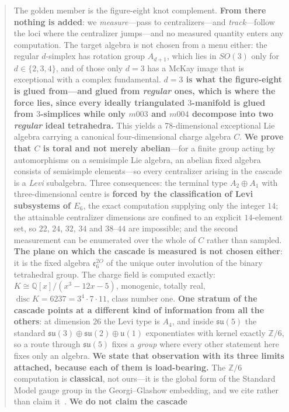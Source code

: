 \documentclass[11pt,reqno]{amsart}
\theoremstyle{plain}
\theoremstyle{definition}
\theoremstyle{remark}
\newcommand{\Q}{\mathbb{Q}}
\newcommand{\Z}{\mathbb{Z}}
\newcommand{\su}{\mathfrak{su}}
\newcommand{\uu}{\mathfrak{u}}
\newcommand{\ee}{\mathfrak{e}}
\newcommand{\disc}{\operatorname{disc}}
\begin{document}
\begin{abstract}
The golden member is the figure-eight knot complement. \textbf{From there nothing is
added}: we \emph{measure}---pass to centralizers---and \emph{track}---follow the loci
where the centralizer jumps---and no measured quantity enters any computation. The
target algebra is not chosen from a menu either: the regular $d$-simplex has rotation
group $A_{d+1}$, which lies in $SO(3)$ only for $d\in\{2,3,4\}$, and of those only
$d=3$ has a McKay image that is exceptional with a complex fundamental. \textbf{$d=3$ is
what the figure-eight is glued from---and glued from \emph{regular} ones, which is where
the force lies, since every ideally triangulated $3$-manifold is glued from $3$-simplices
while only $m003$ and $m004$ decompose into two \emph{regular} ideal tetrahedra.} This yields a $78$-dimensional exceptional Lie
algebra carrying a canonical four-dimensional charge algebra $C$.
\textbf{We prove that $C$ is toral and not merely abelian}---for a finite group acting
by automorphisms on a semisimple Lie algebra, an abelian fixed algebra consists of
semisimple elements---so every centralizer arising in the cascade is a \emph{Levi}
subalgebra. Three consequences: the terminal type $A_2\oplus A_1$ with three-dimensional
centre is \textbf{forced by the classification of Levi subsystems of $E_6$}, the exact
computation supplying only the integer $14$; the attainable centralizer dimensions are
confined to an explicit $14$-element set, so $22$, $24$, $32$, $34$ and $38$--$44$ are
impossible; and the second measurement can be enumerated over the whole of $C$ rather
than sampled. \textbf{The plane on which the cascade is measured is not chosen either}:
it is the fixed algebra $\ee_6^{2O}$ of the unique outer involution of the binary
tetrahedral group. The charge field is computed exactly:
$K\cong\Q[x]/(x^3-12x-5)$, monogenic, totally real, $\disc K=6237=3^4\cdot7\cdot11$,
class number one. \textbf{One stratum of the cascade points at a different kind of
information from all the others}: at dimension $26$ the Levi type is $A_4$, and inside
$\su(5)$ the standard $\su(3)\oplus\su(2)\oplus\uu(1)$ exponentiates with kernel exactly
$\Z/6$, so a route through $\su(5)$ fixes a \emph{group} where every other statement here
fixes only an algebra. \textbf{We state that observation with its three limits attached,
because each of them is load-bearing.} The $\Z/6$ computation is \textbf{classical}, not
ours---it is the global form of the Standard Model gauge group in the
Georgi--Glashow embedding, and we cite rather than claim
it~\cite{GeorgiGlashow,Hucks,BaezHuerta,Tong}. \textbf{We do not claim the cascade
}
\end{abstract}
\end{document}
